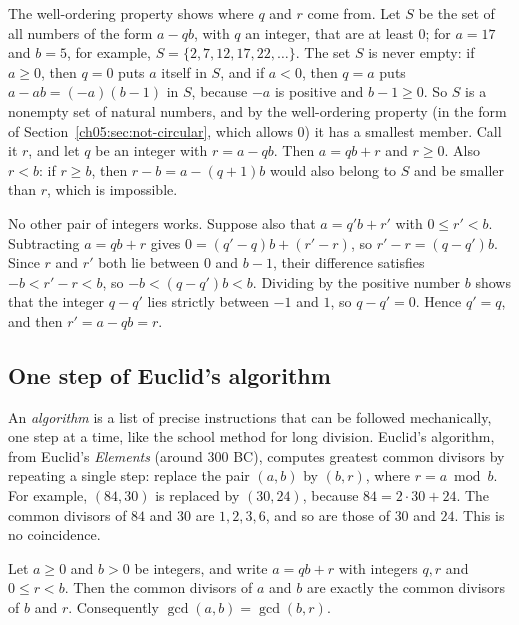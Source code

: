 The well-ordering property shows where $q$ and $r$ come from. Let $S$ be the set of all numbers of the form $a-qb$, with $q$ an integer, that are at least $0$; for $a=17$ and $b=5$, for example, $S=\{2,7,12,17,22,\ldots\}$. The set $S$ is never empty: if $a\ge0$, then $q=0$ puts $a$ itself in $S$, and if $a<0$, then $q=a$ puts $a-ab=(-a)(b-1)$ in $S$, because $-a$ is positive and $b-1\ge0$. So $S$ is a nonempty set of natural numbers, and by the well-ordering property (in the form of Section~\ref{ch05:sec:not-circular}, which allows $0$) it has a smallest member. Call it $r$, and let $q$ be an integer with $r=a-qb$. Then $a=qb+r$ and $r\ge0$. Also $r<b$: if $r\ge b$, then $r-b=a-(q+1)b$ would also belong to $S$ and be smaller than $r$, which is impossible.

No other pair of integers works. Suppose also that $a=q'b+r'$ with $0\le r'<b$. Subtracting $a=qb+r$ gives $0=(q'-q)b+(r'-r)$, so $r'-r=(q-q')b$. Since $r$ and $r'$ both lie between $0$ and $b-1$, their difference satisfies $-b<r'-r<b$, so $-b<(q-q')b<b$. Dividing by the positive number $b$ shows that the integer $q-q'$ lies strictly between $-1$ and $1$, so $q-q'=0$. Hence $q'=q$, and then $r'=a-qb=r$.

\subsection*{One step of Euclid's algorithm}
An \emph{algorithm} is a list of precise instructions that can be followed mechanically, one step at a time, like the school method for long division. Euclid's algorithm, from Euclid's \emph{Elements} (around 300 BC), computes greatest common divisors by repeating a single step: replace the pair $(a,b)$ by $(b,r)$, where $r=a\bmod b$. For example, $(84,30)$ is replaced by $(30,24)$, because $84=2\cdot30+24$. The common divisors of $84$ and $30$ are $1,2,3,6$, and so are those of $30$ and $24$. This is no coincidence.

\par\noindent\begin{minipage}{\linewidth}
\begin{lemma}\label{ch05:lem:euclid-step}
Let $a\ge0$ and $b>0$ be integers, and write $a=qb+r$ with integers $q,r$ and $0\le r<b$. Then the common divisors of $a$ and $b$ are exactly the common divisors of $b$ and $r$. Consequently $\gcd(a,b)=\gcd(b,r)$.
\end{lemma}
\end{minipage}\par

